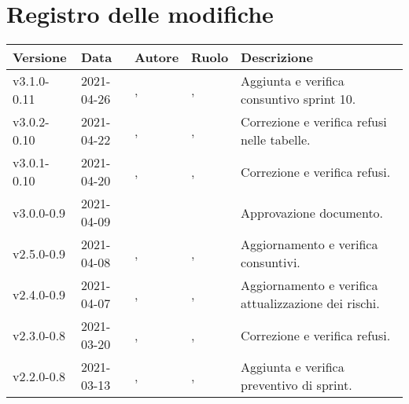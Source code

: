 \section*{\hfil Registro delle modifiche \hfil}
{
	\newlength{\freewidth}
	\setlength{\freewidth}{\dimexpr\textwidth-10\tabcolsep}
	\renewcommand{\arraystretch}{1.5}
	\centering
	\setlength{\aboverulesep}{0pt}
	\setlength{\belowrulesep}{0pt}
	\begin{longtable}{C{.131777\freewidth} C{.134036\freewidth} C{.263554\freewidth} C{.188254\freewidth} C{.282379\freewidth}}
		\toprule 
		\textbf{Versione} & \textbf{Data} & \textbf{Autore} & \textbf{Ruolo} & \textbf{Descrizione}\\
		\toprule
		\endhead
		v3.1.0-0.11 & 2021-04-26 & \Matteo{}, \newline{} \Daniele{} & \ver{}, \newline{} \progr{} & Aggiunta e verifica consuntivo sprint 10. \\
		v3.0.2-0.10 & 2021-04-22 & \Tommaso{}, \newline{} \Lucrezia{} & \ver{}, \newline{} \progr{} & Correzione e verifica refusi nelle tabelle. \\
		v3.0.1-0.10 & 2021-04-20 & \Francesco{}, \newline{} \Daniele{} & \ver{}, \newline{} \progr{} & Correzione e verifica refusi. \\
		v3.0.0-0.9 & 2021-04-09 & \Tommaso{} & \RdP{} & Approvazione documento. \\
		v2.5.0-0.9 & 2021-04-08 & \Daniele{}, \newline{} \Davide{} & \ver{},\newline{} \progr{} & Aggiornamento e verifica consuntivi. \\
		v2.4.0-0.9 & 2021-04-07 & \Lucrezia{}, \newline{} \Davide{} & \ver{},\newline{} \progr{} & Aggiornamento e verifica attualizzazione dei rischi. \\
		v2.3.0-0.8 & 2021-03-20 & \Giosue{}, \newline{} \Francesco{} & \ver{}, \newline{} \prog{} & Correzione e verifica refusi. \\
		v2.2.0-0.8 & 2021-03-13 & \Daniele{}, \newline{} \Davide{} & \ver{},\newline{} \progr{} & Aggiunta e verifica preventivo di sprint. \\

\end{longtable}}
